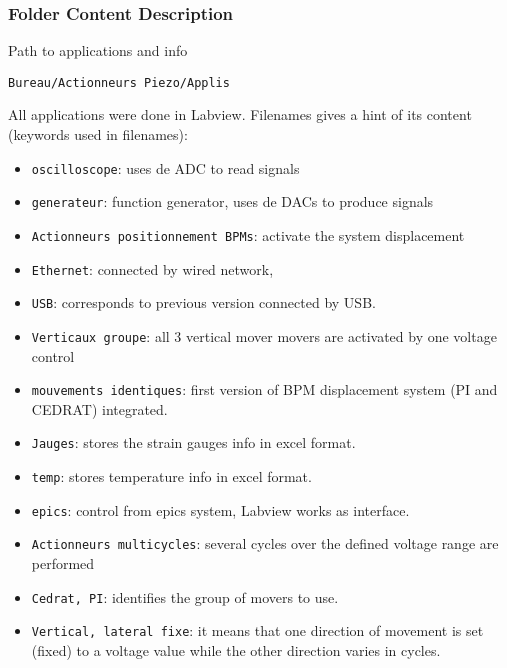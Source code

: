 \subsubsection{Folder Content Description}\par
Path to applications and info\par
\verb?Bureau/Actionneurs Piezo/Applis?\par
All applications were done in Labview. Filenames gives a hint of its content (keywords used in filenames):\par
\begin{itemize}
\item \verb?oscilloscope?: uses de ADC to read signals
\item \verb?generateur?: function generator, uses de DACs to produce signals
\item \verb?Actionneurs positionnement BPMs?: activate the system displacement
\item \verb?Ethernet?: connected by wired network,
\item \verb?USB?: corresponds to previous version connected by USB.
\item \verb?Verticaux groupe?: all 3 vertical mover movers are activated by one voltage control
\item \verb?mouvements identiques?: first version of BPM displacement system (PI and CEDRAT) integrated.
\item \verb?Jauges?: stores the strain gauges info in excel format.
\item \verb?temp?: stores temperature info in excel format.
\item \verb?epics?: control from epics system, Labview works as interface.
\item \verb?Actionneurs multicycles?: several cycles over the defined voltage range are performed
\item \verb?Cedrat, PI?: identifies the group of movers to use.
\item \verb?Vertical, lateral fixe?: it means that one direction of movement is set (fixed) to a voltage value while the other direction varies in cycles.
\end{itemize}
